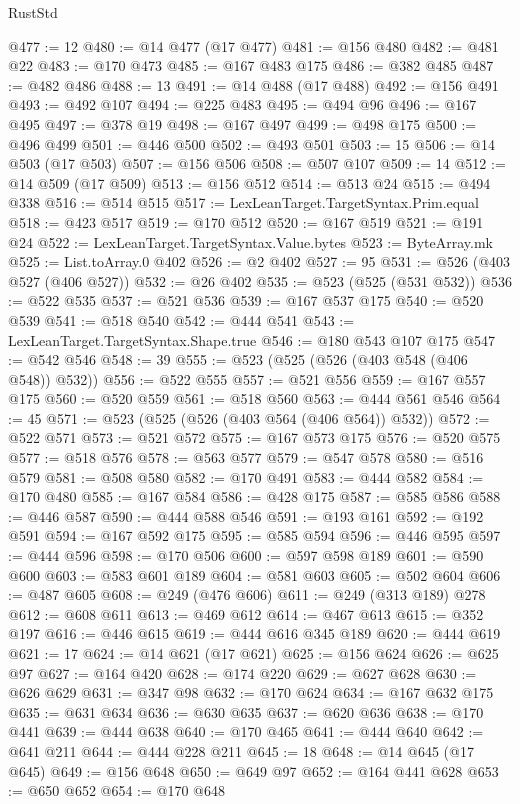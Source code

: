 \begin{lexlean}{RustStd}
\begin{coremodule}
{\begin{coremodule}
{{{{{{{{{{{{{{{{{{{{{{{{{{{{{{{{{{@477 := 12
@480 := @14 @477 (@17 @477)
@481 := @156 @480
@482 := @481 @22
@483 := @170 @473
@485 := @167 @483 @175
@486 := @382 @485
@487 := @482 @486
@488 := 13
@491 := @14 @488 (@17 @488)
@492 := @156 @491
@493 := @492 @107
@494 := @225 @483
@495 := @494 @96
@496 := @167 @495
@497 := @378 @19
@498 := @167 @497
@499 := @498 @175
@500 := @496 @499
@501 := @446 @500
@502 := @493 @501
@503 := 15
@506 := @14 @503 (@17 @503)
@507 := @156 @506
@508 := @507 @107
@509 := 14
@512 := @14 @509 (@17 @509)
@513 := @156 @512
@514 := @513 @24
@515 := @494 @338
@516 := @514 @515
@517 := LexLeanTarget.TargetSyntax.Prim.equal
@518 := @423 @517
@519 := @170 @512
@520 := @167 @519
@521 := @191 @24
@522 := LexLeanTarget.TargetSyntax.Value.bytes
@523 := ByteArray.mk
@525 := List.toArray.{0} @402
@526 := @2 @402
@527 := 95
@531 := @526 (@403 @527 (@406 @527))
@532 := @26 @402
@535 := @523 (@525 (@531 @532))
@536 := @522 @535
@537 := @521 @536
@539 := @167 @537 @175
@540 := @520 @539
@541 := @518 @540
@542 := @444 @541
@543 := LexLeanTarget.TargetSyntax.Shape.true
@546 := @180 @543 @107 @175
@547 := @542 @546
@548 := 39
@555 := @523 (@525 (@526 (@403 @548 (@406 @548)) @532))
@556 := @522 @555
@557 := @521 @556
@559 := @167 @557 @175
@560 := @520 @559
@561 := @518 @560
@563 := @444 @561 @546
@564 := 45
@571 := @523 (@525 (@526 (@403 @564 (@406 @564)) @532))
@572 := @522 @571
@573 := @521 @572
@575 := @167 @573 @175
@576 := @520 @575
@577 := @518 @576
@578 := @563 @577
@579 := @547 @578
@580 := @516 @579
@581 := @508 @580
@582 := @170 @491
@583 := @444 @582
@584 := @170 @480
@585 := @167 @584
@586 := @428 @175
@587 := @585 @586
@588 := @446 @587
@590 := @444 @588 @546
@591 := @193 @161
@592 := @192 @591
@594 := @167 @592 @175
@595 := @585 @594
@596 := @446 @595
@597 := @444 @596
@598 := @170 @506
@600 := @597 @598 @189
@601 := @590 @600
@603 := @583 @601 @189
@604 := @581 @603
@605 := @502 @604
@606 := @487 @605
@608 := @249 (@476 @606)
@611 := @249 (@313 @189) @278
@612 := @608 @611
@613 := @469 @612
@614 := @467 @613
@615 := @352 @197
@616 := @446 @615
@619 := @444 @616 @345 @189
@620 := @444 @619
@621 := 17
@624 := @14 @621 (@17 @621)
@625 := @156 @624
@626 := @625 @97
@627 := @164 @420
@628 := @174 @220
@629 := @627 @628
@630 := @626 @629
@631 := @347 @98
@632 := @170 @624
@634 := @167 @632 @175
@635 := @631 @634
@636 := @630 @635
@637 := @620 @636
@638 := @170 @441
@639 := @444 @638
@640 := @170 @465
@641 := @444 @640
@642 := @641 @211
@644 := @444 @228 @211
@645 := 18
@648 := @14 @645 (@17 @645)
@649 := @156 @648
@650 := @649 @97
@652 := @164 @441 @628
@653 := @650 @652
@654 := @170 @648
}}}}}}}}}}}}}}}}}}}}}}}}}}}}}}}}}}
\end{coremodule}}
\end{coremodule}
\end{lexlean}
